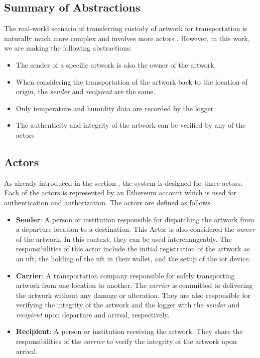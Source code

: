 \subsection*{Summary of Abstractions}
The real-world scenario of transferring custody of artwork for transportation is naturally much more complex and involves more actors \cite{artintransit}. However, in this work, we are making the following abstractions:
\begin{itemize}
    \item The sender of a specific artwork is also the owner of the artwork
    \item When considering the transportation of the artwork back to the location of origin, the \textit{sender} and \textit{recipient} are the same.
    \item Only temperature and humidity data are recorded by the logger
    \item The authenticity and integrity of the artwork can be verified by any of the actors
\end{itemize}

\subsection{Actors}
As already introduced in the section , the system is designed for three actors. Each of the actors is represented by an Ethereum account which is used for authentication and authorization. The actors are defined as follows.

\begin{itemize}[align=left, font=\itshape]
    \item \textbf{Sender}: A person or institution responsible for dispatching the artwork from a departure location to a destination. This Actor is also considered the \textit{owner} of the artwork. In this context, they can be used interchangeably. The responsibilities of this actor include the initial registration of the artwork as an \gls{nft}, the holding of the \gls{nft} in their wallet, and the setup of the \gls{iot} device.

    \item \textbf{Carrier}: A transportation company responsible for safely transporting artwork from one location to another. The \textit{carrier} is committed to delivering the artwork without any damage or alteration. They are also responsible for verifying the integrity of the artwork and the logger with the \textit{sender} and \textit{recipient} upon departure and arrival, respectively.

    \item \textbf{Recipient}: A person or institution receiving the artwork. They share the responsibilities of the \textit{carrier} to verify the integrity of the artwork upon arrival. 
\end{itemize}


